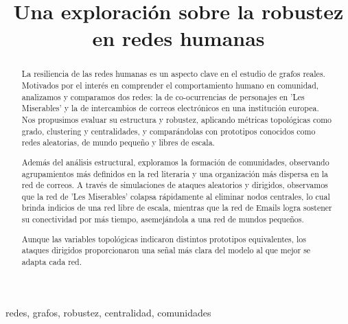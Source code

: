 \documentclass[conference]{IEEEtran}
\begin{document}
\title{Una exploración sobre la robustez en redes humanas\\
{\footnotesize \textsuperscript{}}
}

\author{
\and
{}
\and
{}
\and
{}
}

\maketitle
\thispagestyle{fancy}

\begin{abstract}
La resiliencia de las redes humanas es un aspecto clave en el estudio de grafos reales. Motivados por el interés en comprender el comportamiento humano en comunidad, analizamos y comparamos dos redes: la de co-ocurrencias de personajes en 'Les Miserables' y la de intercambios de correos electrónicos en una institución europea. Nos propusimos evaluar su estructura y robustez, aplicando métricas topológicas como grado, clustering y centralidades, y comparándolas con prototipos conocidos como redes aleatorias, de mundo pequeño y libres de escala.

Además del análisis estructural, exploramos la formación de comunidades, observando agrupamientos más definidos en la red literaria y una organización más dispersa en la red de correos. A través de simulaciones de ataques aleatorios y dirigidos, observamos que la red de 'Les Miserables' colapsa rápidamente al eliminar nodos centrales, lo cual brinda indicios de una red libre de escala, mientras que la red de Emails logra sostener su conectividad por más tiempo, asemejándola a una red de mundos pequeños. 

Aunque las variables topológicas indicaron distintos prototipos equivalentes, los ataques dirigidos proporcionaron una señal más clara del modelo al que mejor se adapta cada red.
\end{abstract}



\begin{IEEEkeywords}
redes, grafos, robustez, centralidad, comunidades
\end{IEEEkeywords}
\end{document}
